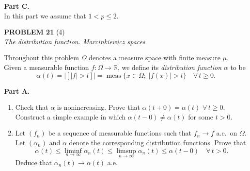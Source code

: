 \documentclass[12pt]{article}
\newcommand{\norm}[1]{\left\|#1\right\|}
\newcommand{\abs}[1]{\left|#1\right|}
\newcommand{\R}{\mathbb{R}}
\begin{document}
\noindent\textbf{Part C.}\\
In this part we assume that $1 < p \le 2$.
 
 
\bigskip
 
\noindent\textbf{PROBLEM 21} (4)\\[4pt]
\textit{The distribution function. Marcinkiewicz spaces}
 
\medskip
 
Throughout this problem $\Omega$ denotes a measure space with finite measure $\mu$.
Given a measurable function $f : \Omega \to \R$, we define its \emph{distribution function} $\alpha$ to be
\[
\alpha(t) = \abs{[\abs{f} > t]} = \operatorname{meas}\{x \in \Omega;\; \abs{f(x)} > t\} \quad \forall\, t \ge 0.
\]
 
\noindent\textbf{Part A.}
 
\begin{enumerate}
\item Check that $\alpha$ is nonincreasing. Prove that $\alpha(t+0) = \alpha(t)$ $\forall\, t \ge 0$.
Construct a simple example in which $\alpha(t-0) \neq \alpha(t)$ for some $t > 0$.
 
\item Let $(f_n)$ be a sequence of measurable functions such that $f_n \to f$ a.e.\ on $\Omega$.
Let $(\alpha_n)$ and $\alpha$ denote the corresponding distribution functions. Prove that
\[
\alpha(t) \le \liminf_{n\to\infty} \alpha_n(t) \le \limsup_{n\to\infty} \alpha_n(t) \le \alpha(t-0) \quad \forall\, t > 0.
\]
Deduce that $\alpha_n(t) \to \alpha(t)$ a.e.
\end{enumerate}
 
\end{document}
